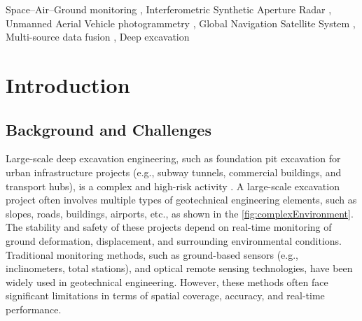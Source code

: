 \documentclass[preprint,11pt,authoryear,3p]{elsarticle}
\begin{document}
\begin{frontmatter}
\begin{abstract}
\end{abstract}



\begin{keyword}


Space--Air--Ground monitoring \sep
Interferometric Synthetic Aperture Radar  \sep
Unmanned Aerial Vehicle photogrammetry \sep
Global Navigation Satellite System \sep
Multi-source data fusion \sep
Deep excavation
\end{keyword}

\end{frontmatter}

\linenumbers

\section{Introduction}

\subsection{Background and Challenges}

Large-scale deep excavation engineering, such as foundation pit excavation for urban infrastructure projects (e.g., subway tunnels, commercial buildings, and transport hubs), is a complex and high-risk activity \citep{gong2019advances}. A large-scale excavation project often involves multiple types of geotechnical engineering elements, such as slopes, roads, buildings, airports, etc., as shown in the \autoref{fig:complexEnvironment}. The stability and safety of these projects depend on real-time monitoring of ground deformation, displacement, and surrounding environmental conditions. Traditional monitoring methods, such as ground-based sensors (e.g., inclinometers, total stations), and optical remote sensing technologies, have been widely used in geotechnical engineering. However, these methods often face significant limitations in terms of spatial coverage, accuracy, and real-time performance. 
\end{document}
